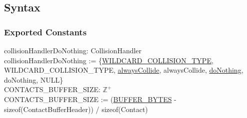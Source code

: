 \documentclass[12pt]{article}
\newcommand{\UZ}{$\mathbb{Z}^+$}
\begin{document}
\subsection{Syntax}

\subsubsection{Exported Constants} \label{SecECSpace}
	collisionHandlerDoNothing: CollisionHandler \\
	collisionHandlerDoNothing := \{\hyperref[SecECControl]{WILDCARD_COLLISION_TYPE}, WILDCARD_COLLISION_TYPE, \hyperref[SecLFSpace]{alwaysCollide}, alwaysCollide, \hyperref[SecLFSpace]{doNothing}, doNothing, NULL\} \\
	\newline
	CONTACTS_BUFFER_SIZE: \UZ \\
	CONTACTS_BUFFER_SIZE := (\hyperref[SecECControl]{BUFFER_BYTES} - sizeof(ContactBufferHeader)) / sizeof(Contact)
\end{document}
